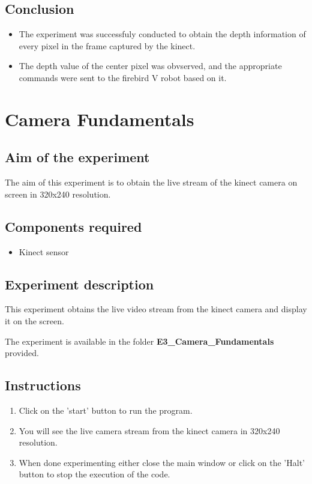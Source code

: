 \begin{flushleft}
\subsection{\textbf{ Conclusion}}
\begin{itemize}
\item The experiment was successfuly conducted to obtain the depth information of every pixel in the frame captured by the kinect.
\item The depth value of the center pixel was obvserved, and the appropriate commands were sent to the firebird V robot based on it.
\end{itemize}
\medskip
\newpage

\section{\textbf{ Camera Fundamentals}}
\label{4.3}

\medskip
\subsection{\textbf{ Aim of the experiment}}
The aim of this experiment is to obtain the live stream of the kinect camera on screen in 320x240 resolution.
\medskip

\subsection{\textbf{ Components required}}
\begin{itemize}
\item Kinect sensor
\end{itemize}
\medskip

\subsection{\textbf{ Experiment description}}
This experiment obtains the live video stream from the kinect camera and display it on the screen.

\medskip
The experiment is available in the folder \textbf{E3\_Camera\_Fundamentals} provided.
\medskip

\subsection{\textbf{ Instructions}}
\begin{enumerate}
\item Click on the 'start' button to run the program.
\item You will see the live camera stream from the kinect camera in 320x240 resolution.
\item When done experimenting either close the main window or click on the 'Halt' button to stop the execution of the code.
\end{enumerate}
\medskip

\end{flushleft}
